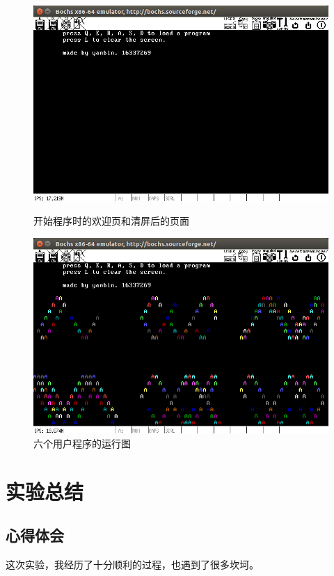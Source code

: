 \documentclass[a4paper]{article}
\begin{document}
    \begin{figure}[H]
    \begin{minipage}{0.48\textwidth}
     \centering
     \includegraphics[width=\linewidth]{assets/helloPage.png}
     \caption{开始程序时的欢迎页和清屏后的页面}\label{fig:helloPage}
   \end{minipage}\hfill
   \begin {minipage}{0.48\textwidth}
     \centering
     \includegraphics[width=\linewidth]{assets/sixPageRun.png}
     \caption{六个用户程序的运行图}\label{fig:sixPageRun}
   \end{minipage}
\end{figure}

\section{实验总结}
    \subsection{心得体会}
    这次实验，我经历了十分顺利的过程，也遇到了很多坎坷。\\
    
\end{document}
